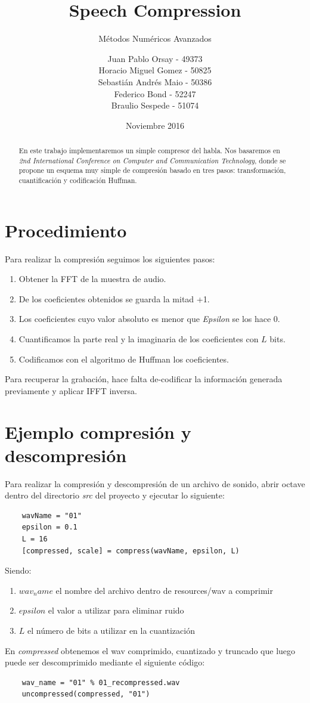 \documentclass[spanish]{scrartcl}
\subtitle{Métodos Numéricos Avanzados}
\title{Speech Compression}
\author{
Juan Pablo Orsay - 49373 \\
Horacio Miguel Gomez - 50825 \\
Sebastián Andrés Maio - 50386 \\
Federico Bond - 52247 \\
Braulio Sespede - 51074
}
\date{Noviembre 2016}
\let\endtitlepage\relax
\begin{document}
\maketitle
\endtitlepage

\begin{abstract}
En este trabajo implementaremos un simple compresor del habla. Nos basaremos en \textit{2nd International Conference on Computer and Communication Technology}, donde se propone un esquema muy simple de compresión basado en tres pasos: transformación, cuantificación y codificación Huffman.
\end{abstract}
\break
\tableofcontents
\break
\section{Procedimiento}
Para realizar la compresión seguimos los siguientes pasos:
\begin{enumerate}
\item Obtener la FFT de la muestra de audio.
\item De los coeficientes obtenidos se guarda la mitad +1.
\item Los coeficientes cuyo valor absoluto es menor que \textit{Epsilon} se los hace 0.
\item Cuantificamos la parte real y la imaginaria de los coeficientes con $L$ bits.
\item Codificamos con el algoritmo de Huffman los coeficientes.
\end{enumerate}
Para recuperar la grabación, hace falta de-codificar la información generada previamente y aplicar IFFT inversa.
\section{Ejemplo compresión y descompresión}
Para realizar la compresión y descompresión de un archivo de sonido, abrir octave dentro del directorio \textit{src} del proyecto y ejecutar lo siguiente:
\begin{lstlisting}
    wavName = "01"
    epsilon = 0.1
    L = 16
    [compressed, scale] = compress(wavName, epsilon, L)
\end{lstlisting}

Siendo:
\begin{enumerate}
    \item $wav_name$ el nombre del archivo dentro de resources/wav a comprimir
    \item $epsilon$ el valor a utilizar para eliminar ruido
    \item $L$ el número de bits a utilizar en la cuantización
\end{enumerate}
En \textit{compressed} obtenemos el wav comprimido, cuantizado y truncado que luego puede ser descomprimido mediante el siguiente código:
\begin{lstlisting}
    wav_name = "01" % 01_recompressed.wav
    uncompressed(compressed, "01")
\end{lstlisting}
\pagebreak
\end{document}

